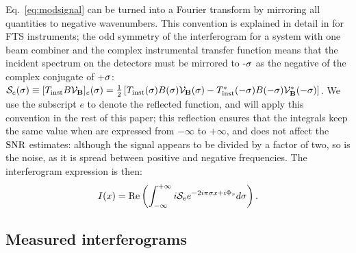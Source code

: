 Eq.~\ref{eq:modsignal} can be turned into a Fourier transform by mirroring all quantities to negative wavenumbers. This
convention is explained in detail in \citet{Davis:2001tr} for FTS instruments; the odd symmetry of the interferogram for a system with one beam combiner
and the complex instrumental transfer function means that the incident spectrum on the detectors
must be mirrored to -$\sigma$ as the negative of the complex conjugate of +$\sigma$: 
$\mathcal{S}_e(\sigma) \equiv [T_{\textrm{inst}} B \mathcal{V}_{\mathbf{B}}]_e(\sigma) = {1 \over 2}\left[T_{\textrm{inst}}(\sigma) B(\sigma) \mathcal{V}_{\mathbf{B}}(\sigma) - T^*_{\textrm{inst}}(-\sigma) B(-\sigma) \mathcal{V}_{\mathbf{B}}^*(-\sigma)\right]$. 
We use the subscript $e$ to denote the reflected function, and will apply this convention in the rest of this paper; this reflection ensures that the integrals keep the same value when are expressed from $-\infty$ to $+\infty$, and does not affect the $\textrm{SNR}$ estimates: although the signal appears to be divided by a factor of two, so is the noise, as it is spread between positive and negative frequencies.
The interferogram expression is then:
\begin{equation}
I(x) = \real\left( \int_{-\infty}^{+\infty} i \S_e  e^{-2i\pi \s x + i\Phir} d\s \right).%
\label{eq:interfero2}
\end{equation}
\subsection{Measured interferograms}

